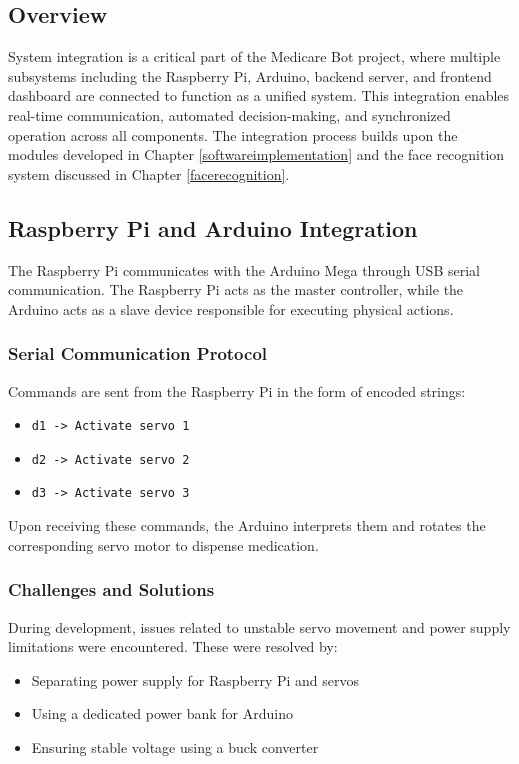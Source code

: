 

\subsection{Overview}

System integration is a critical part of the Medicare Bot project, where multiple subsystems including the Raspberry Pi, Arduino, backend server, and frontend dashboard are connected to function as a unified system. This integration enables real-time communication, automated decision-making, and synchronized operation across all components.
The integration process builds upon the modules developed in Chapter \ref{softwareimplementation} and the face recognition system discussed in Chapter \ref{facerecognition}.
\subsection{Raspberry Pi and Arduino Integration}

The Raspberry Pi communicates with the Arduino Mega through USB serial communication. The Raspberry Pi acts as the master controller, while the Arduino acts as a slave device responsible for executing physical actions.

\subsubsection{Serial Communication Protocol}

Commands are sent from the Raspberry Pi in the form of encoded strings:

\begin{itemize}
\item \texttt{d1 -> Activate servo 1}
\item \texttt{d2 -> Activate servo 2}
\item \texttt{d3 -> Activate servo 3}
\end{itemize}
Upon receiving these commands, the Arduino interprets them and rotates the corresponding servo motor to dispense medication.

\subsubsection{Challenges and Solutions}

During development, issues related to unstable servo movement and power supply limitations were encountered. These were resolved by:

\begin{itemize}
    \item Separating power supply for Raspberry Pi and servos
    \item Using a dedicated power bank for Arduino
    \item Ensuring stable voltage using a buck converter
\end{itemize}

